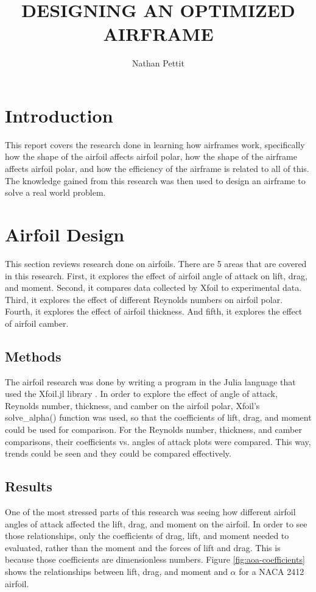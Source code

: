 \documentclass{journal}
\title{DESIGNING AN OPTIMIZED AIRFRAME}
\author{Nathan Pettit}
\begin{document}
	
	\maketitle	
	\section{Introduction}
	This report covers the research done in learning how airframes work, specifically how the shape of the airfoil affects airfoil polar, how the shape of the airframe affects airfoil polar, and how the efficiency of the airframe is related to all of this. The knowledge gained from this research was then used to design an airframe to solve a real world problem.\\
	
	\section{Airfoil Design}
	This section reviews research done on airfoils. There are 5 areas that are covered in this research. First, it explores the effect of airfoil angle of attack on lift, drag, and moment. Second, it compares data collected by Xfoil to experimental data. Third, it explores the effect of different Reynolds numbers on airfoil polar. Fourth, it explores the effect of airfoil thickness. And fifth, it explores the effect of airfoil camber.\\
	
	\subsection{Methods}
	The airfoil research was done by writing a program in the Julia language that used the Xfoil.jl library \cite{McDonnell}. In order to explore the effect of angle of attack, Reynolds number, thickness, and camber on the airfoil polar, Xfoil's solve\_alpha() function was used, so that the coefficients of lift, drag, and moment could be used for comparison. For the Reynolds number, thickness, and camber comparisons, their coefficients vs. angles of attack plots were compared. This way, trends could be seen and they could be compared effectively.
	
	\subsection{Results}
	One of the most stressed parts of this research was seeing how different airfoil angles of attack affected the lift, drag, and moment on the airfoil. In order to see those relationships, only the coefficients of drag, lift, and moment needed to evaluated, rather than the moment and the forces of lift and drag. This is because those coefficients are dimensionless numbers. Figure \ref{fig:aoa-coefficients} shows the relationships between lift, drag, and moment and \(\alpha\) for a NACA 2412 airfoil.\\
	
\end{document}
